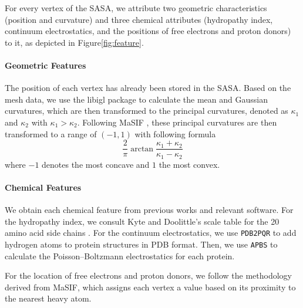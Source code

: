 For every vertex of the SASA, we attribute two geometric characteristics (position and curvature) and three chemical attributes (hydropathy index, continuum electrostatics, and the positions of free electrons and proton donors) to it, as depicted in Figure\ref{fig:feature}.

\paragraph{Geometric Features}
The position of each vertex has already been stored in the SASA.
Based on the mesh data, we use the libigl package to calculate the mean and Gaussian curvatures, which are then transformed to the principal curvatures, denoted as $\kappa_1$ and $\kappa_2$ with $\kappa_1>\kappa_2$.
Following MaSIF \cite{MaSIF}, these principal curvatures are then transformed to a range of $(-1, 1)$ with following formula
\begin{equation}
    \frac{2}{\pi}\arctan\frac{\kappa_1+\kappa_2}{\kappa_1-\kappa_2}
\end{equation}
where $-1$ denotes the most concave and $1$ the most convex.

\paragraph{Chemical Features}
We obtain each chemical feature from previous works and relevant software. For the hydropathy index, we consult Kyte and Doolittle's scale table for the 20 amino acid side chains \cite{hydropathy}.
For the continuum electrostatics, we use \texttt{PDB2PQR} \cite{PDB2PQR} to add hydrogen atoms to protein structures in PDB format.
Then, we use \texttt{APBS} \cite{APBS} to calculate the Poisson–Boltzmann electrostatics for each protein.

For the location of free electrons and proton donors, we follow the methodology derived from MaSIF\cite{MaSIF}, which assigns each vertex a value based on its proximity to the nearest heavy atom.

